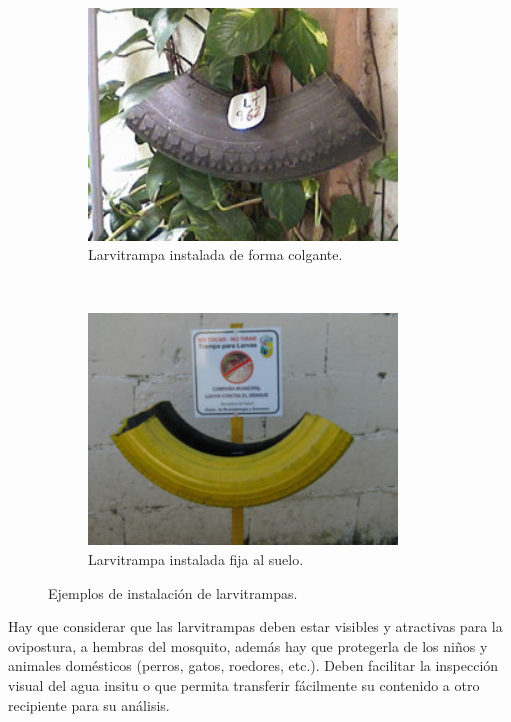 \begin{figure}[!htbp]
    \centering
    \begin{subfigure}[b]{0.45\textwidth}
        \includegraphics[width=0.9\textwidth]{anexos/graphics/ej1-larvitrampa.png}
        \caption{\label{fig:anexo-disenho-1}Larvitrampa instalada de forma colgante.}
    \end{subfigure}
    ~~~~
    \begin{subfigure}[b]{0.45\textwidth}
        \includegraphics[width=0.9\textwidth]{anexos/graphics/ej2-larvitrampa.png}
        \caption{\label{fig:anexo-disenho-2} Larvitrampa instalada fija al suelo.}
    \end{subfigure}
    \caption{\label{fig:instalacion-larvitrampas} Ejemplos de instalación de larvitrampas.}
\end{figure}

Hay que considerar que las larvitrampas deben estar visibles y atractivas para la ovipostura, a
hembras del mosquito, además hay que protegerla de los niños y animales domésticos (perros, gatos,
roedores, etc.). Deben facilitar la inspección visual del agua insitu o que permita transferir
fácilmente su contenido a otro recipiente para su análisis.

